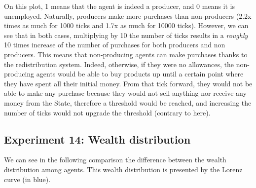 {{{{{{{{{{{{{    On this plot, 1 means that the agent is indeed a producer, and 0 means it is unemployed. Naturally, producers make more purchases than non-producers (2.2x times as much for 1000 ticks and 1.7x as much for 10000 ticks). However, we can see that in both cases, multiplying by 10 the number of ticks results in a \emph{roughly} 10 times increase of the number of purchases for both producers and non producers. This means that  non-producing agents can make purchases thanks to the redistribution system. Indeed, otherwise, if they were no allowances, the non-producing agents would be able to buy products up until a certain point where they have spent all their initial money. From that tick forward, they would not be able to make any purchase because they would not sell anything nor receive any money from the State, therefore a threshold would be reached, and increasing the number of ticks would not upgrade the threshold (contrary to here).
    

    \subsection{Experiment 14: Wealth distribution}
    We can see in the following comparison the difference between the wealth distribution among agents. This wealth distribution is presented by the Lorenz curve (in blue). 

}}}}}}}}}}}}}
